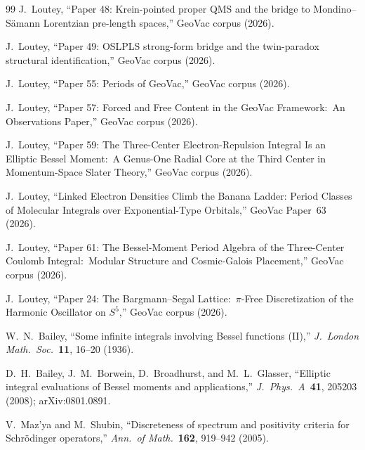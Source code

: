 \documentclass[11pt,a4paper]{article}
\begin{document}
\begin{thebibliography}{99}
J.~Loutey, ``Paper 48: Krein-pointed proper QMS and the bridge to
Mondino--S\"amann Lorentzian pre-length spaces,''
GeoVac corpus (2026).

J.~Loutey, ``Paper 49: OSLPLS strong-form bridge and the
twin-paradox structural identification,'' GeoVac corpus (2026).

J.~Loutey, ``Paper 55: Periods of GeoVac,'' GeoVac corpus (2026).

J.~Loutey, ``Paper 57: Forced and Free Content in the GeoVac Framework:\
An Observations Paper,'' GeoVac corpus (2026).

J.~Loutey, ``Paper 59: The Three-Center Electron-Repulsion Integral Is
an Elliptic Bessel Moment:\ A Genus-One Radial Core at the Third Center in
Momentum-Space Slater Theory,'' GeoVac corpus (2026).

J.~Loutey, ``Linked Electron Densities Climb the Banana Ladder: Period
Classes of Molecular Integrals over Exponential-Type Orbitals,'' GeoVac
Paper~63 (2026).

J.~Loutey, ``Paper 61: The Bessel-Moment Period Algebra of the
Three-Center Coulomb Integral:\ Modular Structure and Cosmic-Galois
Placement,'' GeoVac corpus (2026).

J.~Loutey, ``Paper 24: The Bargmann--Segal Lattice:\ $\pi$-Free
Discretization of the Harmonic Oscillator on $S^5$,'' GeoVac corpus (2026).

W.~N.~Bailey, ``Some infinite integrals involving Bessel functions (II),''
\textit{J.\ London Math.\ Soc.}\ \textbf{11}, 16--20 (1936).

D.~H.~Bailey, J.~M.~Borwein, D.~Broadhurst, and M.~L.~Glasser, ``Elliptic
integral evaluations of Bessel moments and applications,''
\textit{J.\ Phys.\ A}\ \textbf{41}, 205203 (2008); arXiv:0801.0891.

V.~Maz'ya and M.~Shubin, ``Discreteness of spectrum and positivity
criteria for Schr\"odinger operators,''
\textit{Ann.\ of Math.}~\textbf{162}, 919--942 (2005).

\end{thebibliography}
\end{document}
